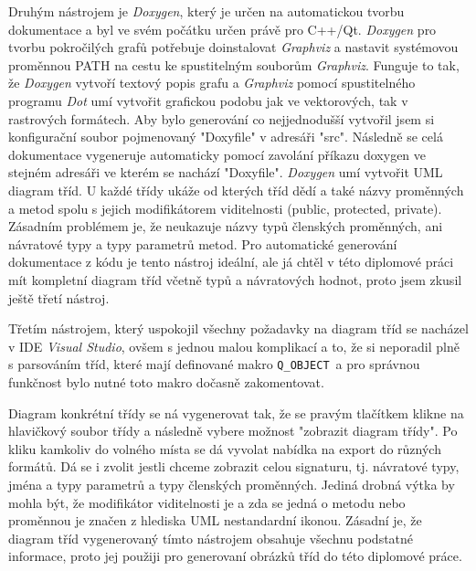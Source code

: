 Druhým nástrojem je \textit{Doxygen}, který je určen na automatickou tvorbu dokumentace a byl ve svém počátku určen právě pro C++/Qt. \textit{Doxygen} pro tvorbu pokročilých grafů potřebuje doinstalovat \textit{Graphviz} a nastavit systémovou proměnnou PATH na cestu ke spustitelným souborům \textit{Graphviz}. Funguje to tak, že \textit{Doxygen} vytvoří textový popis grafu a \textit{Graphviz} pomocí spustitelného programu \textit{Dot} umí vytvořit grafickou podobu jak ve vektorových, tak v rastrových formátech. Aby bylo generování co nejjednodušší vytvořil jsem si konfigurační soubor pojmenovaný "Doxyfile" v adresáři "src". Následně se celá dokumentace vygeneruje automaticky pomocí zavolání příkazu doxygen ve stejném adresáři ve kterém se nachází "Doxyfile". \textit{Doxygen} umí vytvořit UML diagram tříd. U každé třídy ukáže od kterých tříd dědí a také názvy proměnných a metod spolu s jejich modifikátorem viditelnosti (public, protected, private). Zásadním problémem je, že neukazuje názvy typů členských proměnných, ani návratové typy a typy parametrů metod. 
Pro automatické generování dokumentace z kódu je tento nástroj ideální, ale já chtěl v této diplomové práci mít kompletní diagram tříd včetně typů a návratových hodnot, proto jsem zkusil ještě třetí nástroj.


Třetím nástrojem, který uspokojil všechny požadavky na diagram tříd se nacházel v IDE \textit{Visual Studio}, ovšem s jednou malou komplikací a to, že si neporadil plně s parsováním tříd, které mají definované makro \texttt{Q\_OBJECT}\ a pro správnou funkčnost bylo nutné toto makro dočasně zakomentovat. 

Diagram konkrétní třídy se ná vygenerovat tak, že se pravým tlačítkem klikne na hlavičkový soubor třídy a následně vybere možnost "zobrazit diagram třídy". Po kliku kamkoliv do volného místa se dá vyvolat nabídka na export do různých formátů. Dá se i zvolit jestli chceme zobrazit celou signaturu, tj. návratové typy, jména a typy parametrů a typy členských proměnných. Jediná drobná výtka by mohla být, že modifikátor viditelnosti je a zda se jedná o metodu nebo proměnnou je značen z hlediska UML nestandardní ikonou. Zásadní je, že diagram tříd vygenerovaný tímto nástrojem obsahuje všechnu podstatné informace, proto jej použiji pro generovaní obrázků tříd do této diplomové práce.


